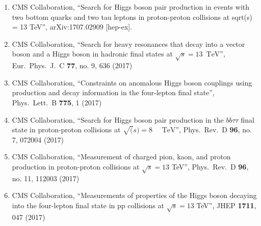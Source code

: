 \begin{enumerate}
\item CMS Collaboration, ``Search for Higgs boson pair production in events with two bottom quarks and two tau leptons in proton-proton collisions at sqrt(s) = 13 TeV'', arXiv:1707.02909 [hep-ex].

\item CMS Collaboration, ``Search for heavy resonances that decay into a vector boson and a Higgs boson in hadronic final states at $\sqrt{s} = 13$ $\,\text {TeV}$'', Eur.\ Phys.\ J.\ C {\bf 77}, no. 9, 636 (2017)

\item CMS Collaboration, ``Constraints on anomalous Higgs boson couplings using production and decay information in the four-lepton final state'', Phys.\ Lett.\ B {\bf 775}, 1 (2017)

\item CMS Collaboration, ``Search for Higgs boson pair production in the $bb\tau\tau$ final state in proton-proton collisions at $\sqrt{(}s)=8\text{ }\text{ }\mathrm{TeV}$'', Phys.\ Rev.\ D {\bf 96}, no. 7, 072004 (2017)

\item CMS Collaboration, ``Measurement of charged pion, kaon, and proton production in proton-proton collisions at $\sqrt{s}=13$ TeV'', Phys.\ Rev.\ D {\bf 96}, no. 11, 112003 (2017)

\item CMS Collaboration, ``Measurements of properties of the Higgs boson decaying into the four-lepton final state in pp collisions at $ \sqrt{s}=13 $ TeV'', JHEP {\bf 1711}, 047 (2017)


\end{enumerate}
